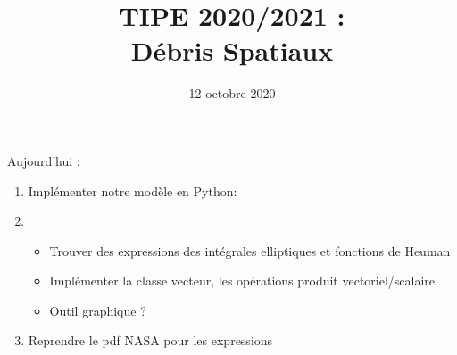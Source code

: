 \documentclass[a4paper,1pt]{article}
\title{TIPE 2020/2021 : \\ Débris Spatiaux}
\date{12 octobre 2020}
\begin{document}
\maketitle

Aujourd'hui :
\begin{enumerate}
    \item Implémenter notre modèle en Python:
    \item \begin{itemize}
        \item Trouver des expressions des intégrales elliptiques et fonctions de Heuman
        \item Implémenter la classe vecteur, les opérations produit vectoriel/scalaire
        \item Outil graphique ?
          \end{itemize}
    \item Reprendre le pdf NASA pour les expressions
\end{enumerate}
\end{document}
